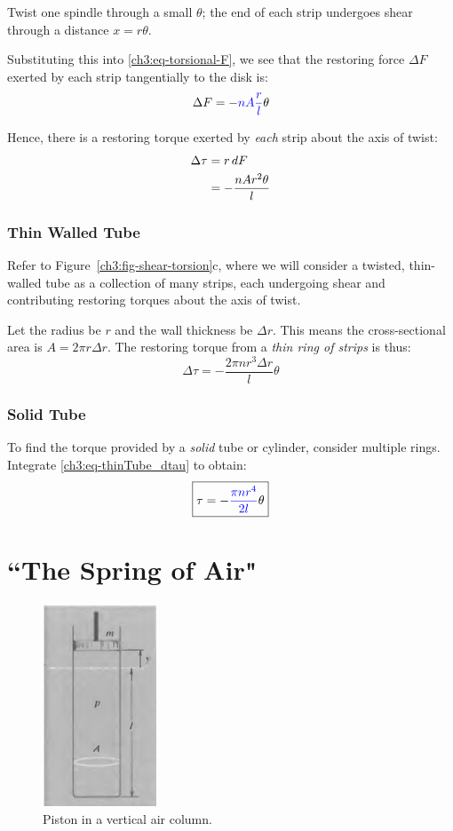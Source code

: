 \documentclass[11pt,letterpaper,titlepage,oneside]{book}
\newcommand{\kcol}[1]{\textcolor{blue}{#1}}
\begin{document}
Twist one spindle through a small $\theta$; the end of each strip undergoes shear through a distance $x=r\theta$. 

Substituting this into \eqref{ch3:eq-torsional-F}, we see that the restoring force $\Delta F$ exerted by each strip tangentially to the disk is:
\[ \Delta F = -\kcol{nA\frac{r}{l}} \theta \]

Hence, there is a restoring torque exerted by \emph{each} strip about the axis of twist:
\begin{align*}
	\Delta\tau &= r\,dF  \notag \\
	&= -\frac{nAr^2\theta}{l} 
\end{align*}

\subsubsection{Thin Walled Tube}
Refer to Figure~\ref{ch3:fig-shear-torsion}c, where we will consider a twisted, thin-walled tube as a collection of many strips, each undergoing shear and contributing restoring torques about the axis of twist.

Let the radius be $r$ and the wall thickness be $\Delta r$. This means the cross-sectional area is $A=2\pi r \Delta r$. The restoring torque from a \emph{thin ring of strips} is thus:
\begin{equation}
\Delta \tau = -\frac{2\pi nr^3\Delta r}{l} \theta  \label{ch3:eq-thinTube_dtau}
\end{equation}

\subsubsection{Solid Tube}
To find the torque provided by a \textit{solid} tube or cylinder, consider multiple rings. Integrate \eqref{ch3:eq-thinTube_dtau} to obtain:
\begin{equation*}
	\boxed{\tau = -\kcol{\frac{\pi nr^4}{2l}} \theta}
\end{equation*}

\section{``The Spring of Air"} \label{ch3:sec-air}

\begin{figure}
	\centering
	\includegraphics[scale=0.7]{phys232/Ch3-air.png} \caption{Piston in a vertical air column.}\label{ch3:fig-air}
\end{figure}
\end{document}
